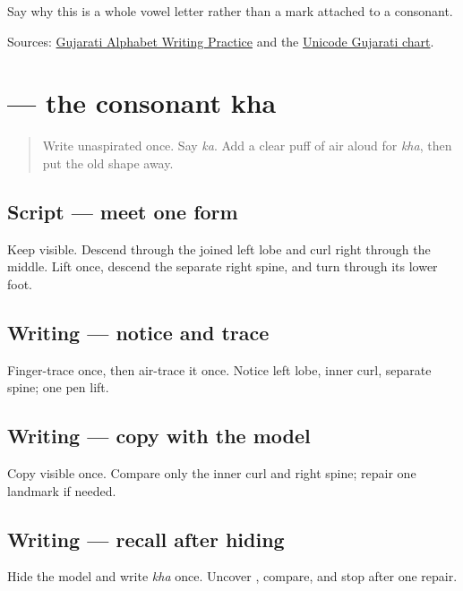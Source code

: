 \begin{tcolorbox}[breakable,colback=teal!4,colframe=teal!35!black,title={Before you move on}]
Say why this is a whole vowel letter rather than a mark attached to a consonant.

Sources: \href{https://www.t30apps.com/gujarati-alphabet-writing/}{Gujarati Alphabet Writing Practice} and the \href{https://www.unicode.org/charts/PDF/U0A80.pdf}{Unicode Gujarati chart}.
\end{tcolorbox}
\section[\texorpdfstring{\gu{ખ} (kha)}{ખ (kha)}]{ — the consonant kha}

\label{lesson:GU-W06-kha}



\begin{quote}
Write unaspirated \textbf{} once. Say \emph{ka}. Add a clear puff of air aloud for \emph{kha}, then put the old shape away.
\end{quote}

\subsection*{Script — meet one form}
Keep \textbf{} visible. Descend through the joined left lobe and curl right through the middle. Lift once, descend the separate right spine, and turn through its lower foot.

\subsection*{Writing — notice and trace}

Finger-trace \textbf{} once, then air-trace it once. Notice left lobe, inner curl, separate spine; one pen lift.

\subsection*{Writing — copy with the model}
Copy visible \textbf{} once. Compare only the inner curl and right spine; repair one landmark if needed.

\subsection*{Writing — recall after hiding}
Hide the model and write \emph{kha} once. Uncover \textbf{}, compare, and stop after one repair.

